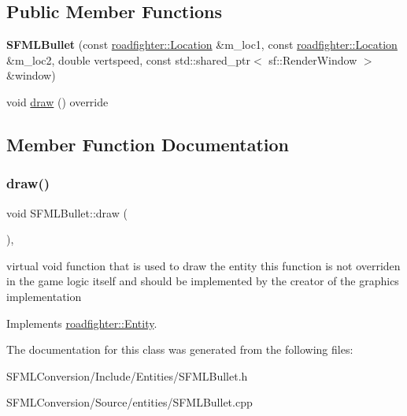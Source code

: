 \subsection*{Public Member Functions}
\begin{DoxyCompactItemize}
\item 
\mbox{\label{classSFMLBullet_a2b3500037bdd26f039c24fc0f8d9ddeb}} 
{\bfseries S\+F\+M\+L\+Bullet} (const \hyperlink{classroadfighter_1_1Location}{roadfighter\+::\+Location} \&m\+\_\+loc1, const \hyperlink{classroadfighter_1_1Location}{roadfighter\+::\+Location} \&m\+\_\+loc2, double vertspeed, const std\+::shared\+\_\+ptr$<$ sf\+::\+Render\+Window $>$ \&window)
\item 
void \hyperlink{classSFMLBullet_a2b774898d1f369ab6d1e58659dab389a}{draw} () override
\end{DoxyCompactItemize}


\subsection{Member Function Documentation}
\mbox{\label{classSFMLBullet_a2b774898d1f369ab6d1e58659dab389a}} 
\subsubsection{\texorpdfstring{draw()}{draw()}}
{\footnotesize\ttfamily void S\+F\+M\+L\+Bullet\+::draw (\begin{DoxyParamCaption}{ }\end{DoxyParamCaption})\hspace{0.3cm}{\ttfamily [override]}, {\ttfamily [virtual]}}

virtual void function that is used to draw the entity this function is not overriden in the game logic itself and should be implemented by the creator of the graphics implementation 

Implements \hyperlink{classroadfighter_1_1Entity_ac516f8005f969ad5a86c252e5a3640ee}{roadfighter\+::\+Entity}.



The documentation for this class was generated from the following files\+:\begin{DoxyCompactItemize}
\item 
S\+F\+M\+L\+Conversion/\+Include/\+Entities/S\+F\+M\+L\+Bullet.\+h\item 
S\+F\+M\+L\+Conversion/\+Source/entities/S\+F\+M\+L\+Bullet.\+cpp\end{DoxyCompactItemize}
